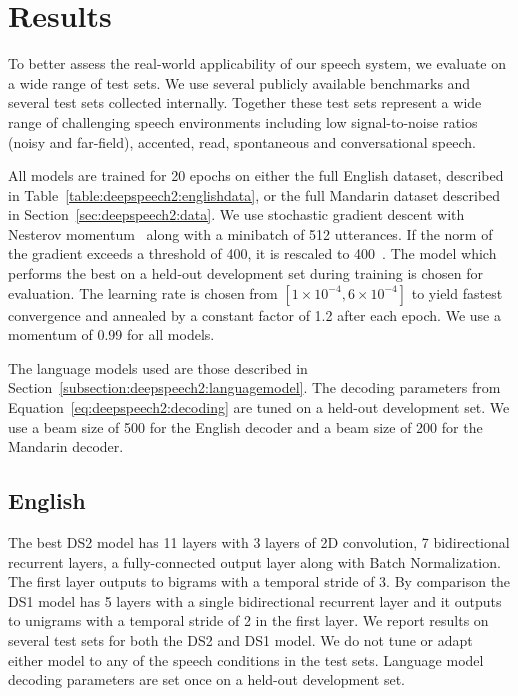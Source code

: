 \section{Results}
\label{sec:deepspeech2:results}

To better assess the real-world applicability of our speech system, we evaluate
on a wide range of test sets. We use several publicly available benchmarks and
several test sets collected internally. Together these test sets represent a
wide range of challenging speech environments including low signal-to-noise
ratios (noisy and far-field), accented, read, spontaneous and conversational
speech. 

All models are trained for 20 epochs on either the full English dataset,
described in Table~\ref{table:deepspeech2:englishdata}, or the full Mandarin
dataset described in Section~\ref{sec:deepspeech2:data}. We use stochastic
gradient descent with Nesterov momentum~\cite{sutskever2013} along with a
minibatch of 512 utterances. If the norm of the gradient exceeds a threshold of
400, it is rescaled to 400~\cite{pascanu2013}. The model which performs the
best on a held-out development set during training is chosen for evaluation.
The learning rate is chosen from $[1\times10^{-4}, 6\times10^{-4}]$ to yield
fastest convergence and annealed by a constant factor of 1.2 after each epoch.
We use a momentum of 0.99 for all models.

The language models used are those described in
Section~\ref{subsection:deepspeech2:languagemodel}. The decoding parameters
from Equation~\ref{eq:deepspeech2:decoding} are tuned on a held-out development
set. We use a beam size of 500 for the English decoder and a beam size of 200
for the Mandarin decoder.

\subsection{English}

The best DS2 model has 11 layers with 3 layers of 2D convolution, 7
bidirectional recurrent layers, a fully-connected output layer along with Batch
Normalization. The first layer outputs to bigrams with a temporal stride of 3.
By comparison the DS1 model has 5 layers with a single bidirectional recurrent
layer and it outputs to unigrams with a temporal stride of 2 in the first
layer. We report results on several test sets for both the DS2 and DS1 model.
We do not tune or adapt either model to any of the speech conditions in the
test sets. Language model decoding parameters are set once on a held-out
development set.


